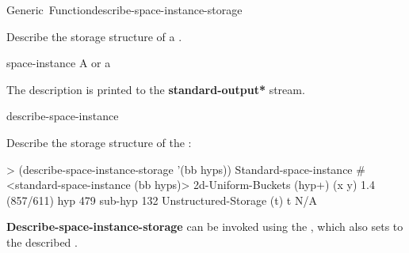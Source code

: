 \documentclass[10pt,twoside,english,pdftex]{article}
\begin{document}
\begin{functiondoc}{Generic~Function}{describe-space-instance-storage}%
  {}
%
%

\fnsyntax

\fnpurpose Describe the storage structure of a .

\fnmethods
{}%
  {\code{(} }
%
  {\code{(} }

\fnpackage {}

\fnmodule {}

\fnargs
\begin{args}{space-instance}
 A  or a 
\end{args}

\fndescription
{}%
The description is printed to the {\bf *standard-output*} stream.

\begin{alsos}{describe-space-instance}
\end{alsos}

\fnexample
Describe the storage structure of the  :
%
\W\supp
\begin{example}
> (describe-space-instance-storage '(bb hyps))
  Standard-space-instance #<standard-space-instance (bb hyps)>
  2d-Uniform-Buckets (hyp+) (x y) 1.4 (857/611)
     hyp             479
     sub-hyp         132
  Unstructured-Storage (t) t N/A
\end{example}

\fnnote 
%
%
%
\textbf{Describe-space-instance-storage} can be invoked using the
 , which also sets \code{=} to the described
.

\end{functiondoc}

\end{document}
